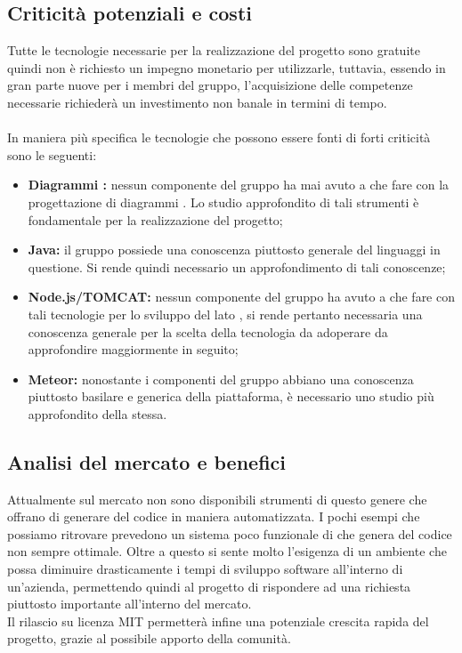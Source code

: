   \subsection{Criticità potenziali e costi}
    Tutte le tecnologie necessarie per la realizzazione del progetto sono gratuite quindi non è richiesto
    un impegno monetario per utilizzarle, tuttavia, essendo in gran parte nuove per i membri del gruppo,
    l'acquisizione delle competenze necessarie richiederà un investimento non banale in termini di
    tempo.
    \\ \\
    In maniera più specifica le tecnologie che possono essere fonti di forti criticità sono le seguenti:
      \begin{itemize}
        \item \textbf{Diagrammi :} nessun componente del gruppo ha mai avuto a che fare con la progettazione di diagrammi . Lo studio approfondito di tali strumenti è fondamentale per la realizzazione del progetto;
        \item \textbf{Java:} il gruppo possiede una conoscenza piuttosto generale del linguaggi in questione. Si rende quindi necessario un approfondimento di tali conoscenze;
        \item \textbf{Node.js/TOMCAT:} nessun componente del gruppo ha avuto a che fare con tali tecnologie per lo sviluppo del lato , si rende pertanto necessaria una conoscenza
        generale per la scelta della tecnologia da adoperare da approfondire maggiormente in seguito;
        \item \textbf{Meteor:} nonostante i componenti del gruppo abbiano una conoscenza piuttosto basilare e generica della piattaforma, è necessario uno studio più approfondito della stessa.
      \end{itemize}
  \subsection{Analisi del mercato e benefici}
    Attualmente sul mercato non sono disponibili strumenti di questo genere che offrano di generare del codice in maniera automatizzata. I pochi esempi che possiamo ritrovare
    prevedono un sistema poco funzionale di  che genera del codice non sempre ottimale.
    Oltre a questo si sente molto l'esigenza di un ambiente che possa diminuire drasticamente i tempi di sviluppo software all'interno di un'azienda, permettendo quindi al progetto
    di rispondere ad una richiesta piuttosto importante all'interno del mercato. \\
    Il rilascio su licenza MIT permetterà infine una potenziale crescita rapida del progetto, grazie al possibile apporto della comunità.
